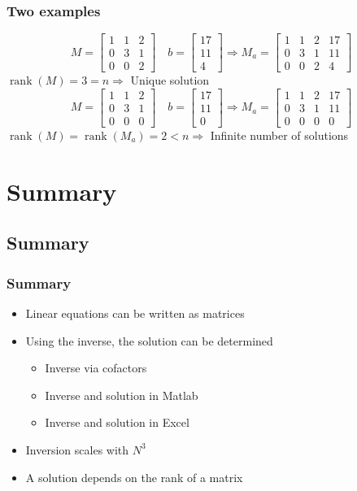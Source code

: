 \documentclass[11pt,table,final,xcolor={usenames,dvipsnames,table}]{beamer}
\DeclareMathOperator{\rank}{rank}
\begin{document}
\begin{frame}[fragile]
  \frametitle{Two examples}
  \[
    M=
    \begin{bmatrix}
      1 & 1 & 2\\
      0 & 3 & 1\\
      0 & 0 & 2
    \end{bmatrix}\quad
    b=
    \begin{bmatrix}
      17\\11\\4
    \end{bmatrix}
    \Rightarrow
    M_a=
    \begin{bmatrix}
      1 & 1 & 2 & 17\\
      0 & 3 & 1 & 11\\
      0 & 0 & 2 & 4
    \end{bmatrix}
  \]
  $\rank(M)=3=n \Rightarrow $ Unique solution \pause \\ \vfill
    \[
    M=
    \begin{bmatrix}
      1 & 1 & 2\\
      0 & 3 & 1\\
      0 & 0 & 0
    \end{bmatrix}\quad
    b=
    \begin{bmatrix}
      17\\11\\0
    \end{bmatrix}
    \Rightarrow
    M_a=
    \begin{bmatrix}
      1 & 1 & 2 & 17\\
      0 & 3 & 1 & 11\\
      0 & 0 & 0 & 0
    \end{bmatrix}
  \]
  $\rank(M)=\rank(M_a)=2<n \Rightarrow $ Infinite number of solutions
\end{frame} 

\section{Summary}
\subsection*{Summary}

\begin{frame}[fragile]
  \frametitle{Summary}
  \begin{itemize}
    \item Linear equations can be written as matrices
    \item Using the inverse, the solution can be determined
    \begin{itemize}
      \item Inverse via cofactors
      \item Inverse and solution in Matlab
      \item Inverse and solution in Excel
    \end{itemize}
    \item Inversion scales with $N^3$
    \item A solution depends on the rank of a matrix
  \end{itemize}
\end{frame}
\end{document}
